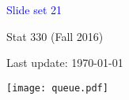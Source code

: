 \documentclass[20pt,landscape]{foils}
\newcommand{\no}{\noindent}
\newcommand{\bul}{\hspace*{.1in}{\textcolor{red}{$\bullet$ \ }}}
\begin{document}
\LogoOff

\foilhead[1.3in]{}
\centerline{\LARGE \textcolor{blue}{Slide set 21}}
\vspace{0.3in}
\centerline{\large Stat 330 (Fall 2016)}
\vspace{0.2in}
\centerline{\tiny Last update: \today}
\setcounter{page}{0}


\foilhead[-.8in]{\textcolor{blue}{Queuing systems}}\vspace*{.35in}
 \centerline{\texttt{[image: queue.pdf]}}
\end{document}
